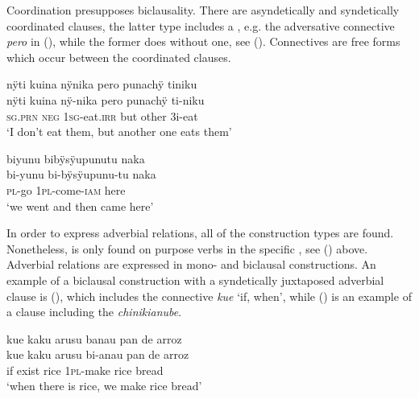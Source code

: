 Coordination presupposes biclausality. There are asyndetically and syndetically coordinated clauses, the latter type includes a , e.g. the adversative connective \textit{pero} in (), while the former does without one, see (). Connectives are free forms which occur between the coordinated clauses.

\ea\label{ex:Sketch-COORD-syn}
\begingl
\glpreamble nÿti kuina nÿnika pero punachÿ tiniku\\
\gla nÿti kuina nÿ-nika pero punachÿ ti-niku\\
\textsc{sg.prn} \textsc{neg} 1\textsc{sg}-eat.\textsc{irr} but other 3i-eat\\
\glft ‘I don’t eat them, but another one eats them’\\
\endgl
\xe

\ea\label{ex:Sketch-COORD-as}
\begingl
\glpreamble biyunu bibÿsÿupunutu naka\\
\gla bi-yunu bi-bÿsÿupunu-tu naka\\
\textsc{pl}-go 1\textsc{pl}-come-\textsc{iam} here\\
\glft ‘we went and then came here’\\
\endgl
\xe
{}

In order to express adverbial relations, all of the construction types are found.  Nonetheless,  is only found on purpose verbs in the specific , see () above. Adverbial relations are expressed in mono- and biclausal constructions. An example of a biclausal construction with a syndetically juxtaposed adverbial clause is (), which includes the connective \textit{kue} ‘if, when’, while () is an example of a  clause including the  \textit{chinikianube}.

\ea\label{ex:Sketch-ADV-syn}
\begingl
\glpreamble kue kaku arusu banau pan de arroz\\
\gla kue kaku arusu bi-anau {pan de arroz}\\
\glb if exist rice 1\textsc{pl}-make {rice bread}\\
\glft ‘when there is rice, we make rice bread’\\
\endgl
\xe

